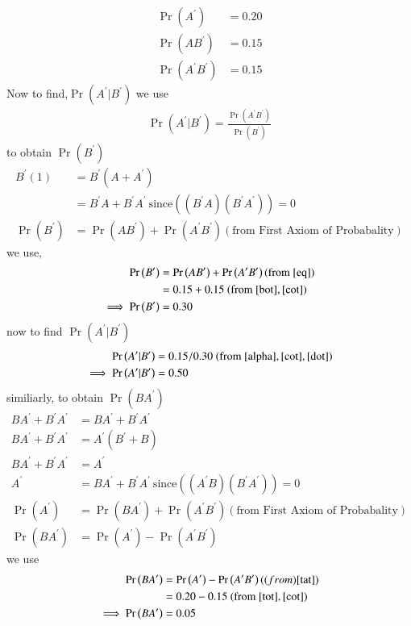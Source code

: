 \documentclass[journal,12pt,twocolumn]{IEEEtran}
\providecommand{\pr}[1]{\ensuremath{\Pr\left(#1\right)}}
\theoremstyle{remark}
\begin{document}
\begin{align}
\pr{A^\prime} &= 0.20 \label{tot}
\\\pr{AB^ \prime}&=0.15 \label{bot}
\\\pr{A ^\prime B ^\prime}&=0.15 \label{cot}
\end{align}
Now to find,$\pr{A ^\prime|B ^\prime}$ we use
\begin{align}
 \pr{A ^\prime|B ^\prime}=\frac{\pr{ A ^\prime B ^\prime }}{\pr{B^\prime}} \label{dot}
\end{align}
to obtain $\pr{B ^\prime}$ 
\begin{align}
B^ \prime(1)&=B^ \prime(A+A ^\prime)
\\&=B^ \prime A +B^ \prime A ^\prime
\ \text{since} ((B^ \prime A )(B^ \prime A ^\prime))=0
\\\pr{B^ \prime}&=\pr{A B ^\prime} + \pr{A ^\prime B ^\prime} (\text{from First Axiom of Probabality}) \label{eq}
\end{align}
we use,
\begin{align}
 \pr{B^ \prime}&= \pr{A B ^\prime} + \pr{A ^\prime B ^\prime}  (\text{from }\eqref{eq})
\\             &=0.15 +0.15 \ (\text{from } \eqref{bot},\eqref{cot})
\\ \implies \pr{B ^\prime} &=0.30 \label{alpha}
\end{align}
now to find $\pr{A ^\prime|B ^\prime}$
\begin{align}
 \pr{A^\prime|B ^\prime}&= 0.15/0.30 \  (\text{from }\eqref{alpha},\eqref{cot},\eqref{dot})
\\ \implies \pr{A ^\prime|B ^\prime} &= 0.50
\end{align}
similiarly, to obtain $\pr{B A ^\prime}$ 
\begin{align}
B A ^\prime +B ^\prime A ^\prime &=B A ^\prime +B ^\prime A ^\prime
\\ B A ^\prime +B ^\prime A^\prime&=A ^\prime(B ^\prime +B)
\\ B A ^\prime +B ^\prime A ^\prime&=A^\prime
\\ A^\prime &=  B A ^\prime +B ^\prime A ^\prime
\ \text{since} ((A^ \prime B )(B^ \prime A ^\prime))=0
\\ \pr{A^ \prime}&=\pr{B A ^\prime} + \pr{A ^\prime B ^\prime} (\text{from First Axiom of Probabality})
\\ \pr{B  A ^\prime}&=\pr{A^\prime}-\pr{A ^\prime B ^\prime} \label{tat}
\end{align}
 we use
\begin{align}
 \pr{B  A ^\prime}&=\pr{A^\prime}-\pr{A ^\prime B ^\prime} (\text(from ) \eqref{tat})
\\ &= 0.20-0.15  \ (\text{from } \eqref{tot}, \eqref{cot})
\\ \implies \pr{B  A^\prime} &= 0.05
\end{align}
\end{document}
